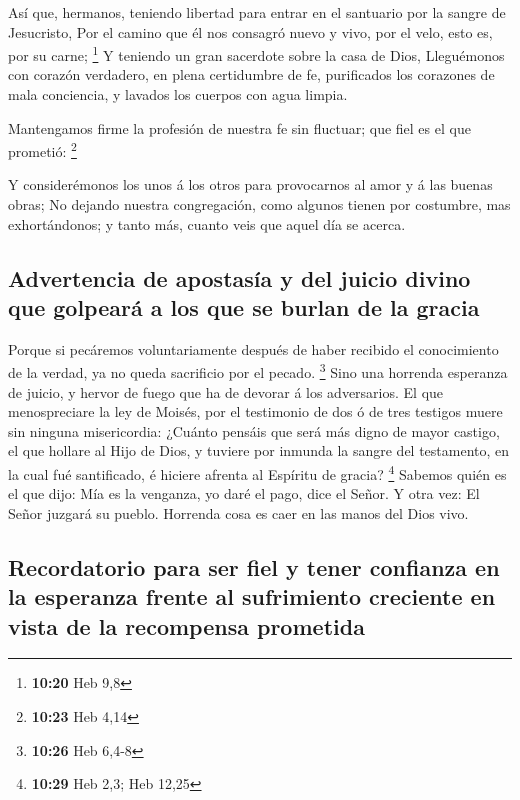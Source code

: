  Así que, hermanos, teniendo libertad para entrar en el
santuario por la sangre de Jesucristo,  Por el camino que
él nos consagró nuevo y vivo, por el velo, esto es, por su carne;
\footnote{\textbf{10:20} Heb 9,8}  Y teniendo un gran
sacerdote sobre la casa de Dios,  Lleguémonos con corazón
verdadero, en plena certidumbre de fe, purificados los corazones de mala
conciencia, y lavados los cuerpos con agua limpia.

 Mantengamos firme la profesión de nuestra fe sin fluctuar;
que fiel es el que prometió: \footnote{\textbf{10:23} Heb 4,14}

 Y considerémonos los unos á los otros para provocarnos al
amor y á las buenas obras;  No dejando nuestra
congregación, como algunos tienen por costumbre, mas exhortándonos; y
tanto más, cuanto veis que aquel día se acerca.

\hypertarget{advertencia-de-apostasuxeda-y-del-juicio-divino-que-golpearuxe1-a-los-que-se-burlan-de-la-gracia}{%
\subsection{Advertencia de apostasía y del juicio divino que golpeará a
los que se burlan de la
gracia}\label{advertencia-de-apostasuxeda-y-del-juicio-divino-que-golpearuxe1-a-los-que-se-burlan-de-la-gracia}}

 Porque si pecáremos voluntariamente después de haber
recibido el conocimiento de la verdad, ya no queda sacrificio por el
pecado. \footnote{\textbf{10:26} Heb 6,4-8}  Sino una
horrenda esperanza de juicio, y hervor de fuego que ha de devorar á los
adversarios.  El que menospreciare la ley de Moisés, por el
testimonio de dos ó de tres testigos muere sin ninguna misericordia:
 ¿Cuánto pensáis que será más digno de mayor castigo, el
que hollare al Hijo de Dios, y tuviere por inmunda la sangre del
testamento, en la cual fué santificado, é hiciere afrenta al Espíritu de
gracia? \footnote{\textbf{10:29} Heb 2,3; Heb 12,25} 
Sabemos quién es el que dijo: Mía es la venganza, yo daré el pago, dice
el Señor. Y otra vez: El Señor juzgará su pueblo.  Horrenda
cosa es caer en las manos del Dios vivo.

\hypertarget{recordatorio-para-ser-fiel-y-tener-confianza-en-la-esperanza-frente-al-sufrimiento-creciente-en-vista-de-la-recompensa-prometida}{%
\subsection{Recordatorio para ser fiel y tener confianza en la esperanza
frente al sufrimiento creciente en vista de la recompensa
prometida}\label{recordatorio-para-ser-fiel-y-tener-confianza-en-la-esperanza-frente-al-sufrimiento-creciente-en-vista-de-la-recompensa-prometida}}

